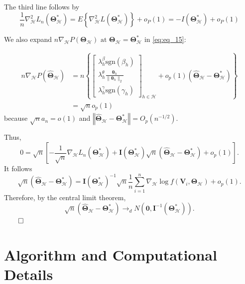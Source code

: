 \documentclass[12pt,letter]{article}\usepackage[]{graphicx}\usepackage[]{color}
\newcommand{\bTheta}{\boldsymbol{\Theta}}
\newcommand{\btheta}{\boldsymbol{\theta}}
\begin{document}
The third line follows by
\[\frac{1}{n} \nabla_{\mathcal{H}}^{2} L_{n}\left(\boldsymbol{\bTheta}_{\mathcal{H}}^{*}\right)=E\left\{\nabla_{\mathcal{H}}^{2} L\left(\boldsymbol{\bTheta}_{\mathcal{H}}^{*}\right)\right\}+o_{P}(1)=-I\left(\boldsymbol{\bTheta}_{\mathcal{H}}^{*}\right)+o_{P}(1)\]

We also expand $n\nabla_{\mathcal{H}}P\left(\boldsymbol{\Theta}_{\mathcal{H}}\right)\text{ at }\boldsymbol{\Theta}_{\mathcal{H}}=\boldsymbol{\Theta}_{\mathcal{H}}^{*}$ in \eqref{eq:eq_15}:
	
	\[
	\begin{aligned}n\nabla_{\mathcal{H}}P\left(\widehat{\boldsymbol{\Theta}}_{\mathcal{H}}\right) & =n\left\{ \left[\begin{array}{c}
	{\lambda_{h}^{\beta}\textrm{sgn}\left(\beta_{h}\right)}\\
	{\lambda_{h}^{\theta}  \frac{\btheta_{h}}{\| \btheta_{h} \|_2}    }\\
	{\lambda_{h}^{\gamma}\textrm{sgn}\left(\gamma_{h}\right)}
	\end{array}\right]_{h\in\mathcal{H}}+o_{p}(1)\left(\widehat{\boldsymbol{\Theta}}_{\mathcal{H}}-\boldsymbol{\Theta}_{\mathcal{H}}^{*}\right)\right\} \\
	& =\sqrt{n}o_{p}(1)
	\end{aligned}
	\]
	because $\sqrt{n}a_{n}=$$o(1)$ and $\left\Vert \widehat{\boldsymbol{\Theta}}_{\mathcal{H}}-\boldsymbol{\Theta}_{\mathcal{H}}^{*}\right\Vert =O_{p}\left(n^{-1/2}\right)$.



Thus, 
\[
0=\sqrt{n}\left[-\frac{1}{\sqrt{n}}\nabla_{\mathcal{H}}L_{n}\left(\boldsymbol{\Theta}_{\mathcal{H}}^{*}\right)+\boldsymbol{I}\left(\boldsymbol{\Theta}_{\mathcal{H}}^{*}\right)\sqrt{n}\left(\widehat{\boldsymbol{\Theta}}_{\mathcal{H}}-\boldsymbol{\Theta}_{\mathcal{H}}^{*}\right)+o_{p}(1)\right].
\]
It follows 
\[
\sqrt{n}\left(\widehat{\boldsymbol{\Theta}}_{\mathcal{H}}-\boldsymbol{\Theta}_{\mathcal{H}}^{*}\right)=\boldsymbol{I}\left(\boldsymbol{\Theta}_{\mathcal{H}}^{*}\right)^{-1}\sqrt{n}\frac{1}{n}\sum_{i=1}^{n}\nabla_{\mathcal{H}}\log f\left(\boldsymbol{V}_{i},\boldsymbol{\Theta}_{\mathcal{H}}\right)+o_{p}(1).
\]
Therefore, by the central limit theorem, 
\[
\sqrt{n}\left(\widehat{\boldsymbol{\Theta}}_{\mathcal{H}}-\boldsymbol{\Theta}_{\mathcal{H}}^{*}\right)\rightarrow_{d}N\left(\mathbf{0},\boldsymbol{I}^{-1}\left(\boldsymbol{\Theta}_{\mathcal{H}}^{*}\right)\right).
\]
$\qed$

\section{Algorithm and Computational Details} \label{sec:sail_algorithm}
\end{document}
